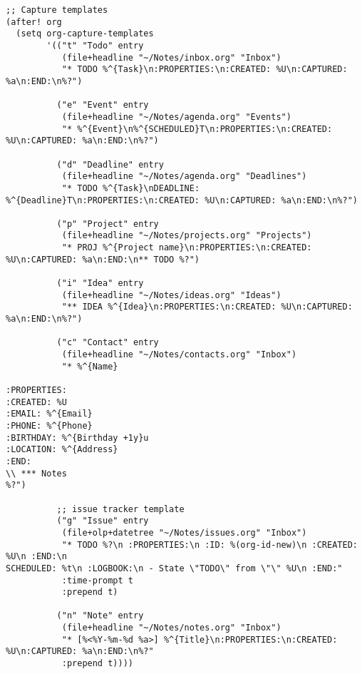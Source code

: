 \documentclass[11pt]{article}
\begin{document}
\begin{verbatim}
;; Capture templates
(after! org
  (setq org-capture-templates
        '(("t" "Todo" entry
           (file+headline "~/Notes/inbox.org" "Inbox")
           "* TODO %^{Task}\n:PROPERTIES:\n:CREATED: %U\n:CAPTURED: %a\n:END:\n%?")

          ("e" "Event" entry
           (file+headline "~/Notes/agenda.org" "Events")
           "* %^{Event}\n%^{SCHEDULED}T\n:PROPERTIES:\n:CREATED: %U\n:CAPTURED: %a\n:END:\n%?")

          ("d" "Deadline" entry
           (file+headline "~/Notes/agenda.org" "Deadlines")
           "* TODO %^{Task}\nDEADLINE: %^{Deadline}T\n:PROPERTIES:\n:CREATED: %U\n:CAPTURED: %a\n:END:\n%?")

          ("p" "Project" entry
           (file+headline "~/Notes/projects.org" "Projects")
           "* PROJ %^{Project name}\n:PROPERTIES:\n:CREATED: %U\n:CAPTURED: %a\n:END:\n** TODO %?")

          ("i" "Idea" entry
           (file+headline "~/Notes/ideas.org" "Ideas")
           "** IDEA %^{Idea}\n:PROPERTIES:\n:CREATED: %U\n:CAPTURED: %a\n:END:\n%?")

          ("c" "Contact" entry
           (file+headline "~/Notes/contacts.org" "Inbox")
           "* %^{Name}

:PROPERTIES:
:CREATED: %U
:EMAIL: %^{Email}
:PHONE: %^{Phone}
:BIRTHDAY: %^{Birthday +1y}u
:LOCATION: %^{Address}
:END:
\\ *** Notes
%?")

          ;; issue tracker template
          ("g" "Issue" entry
           (file+olp+datetree "~/Notes/issues.org" "Inbox")
           "* TODO %?\n :PROPERTIES:\n :ID: %(org-id-new)\n :CREATED: %U\n :END:\n
SCHEDULED: %t\n :LOGBOOK:\n - State \"TODO\" from \"\" %U\n :END:"
           :time-prompt t
           :prepend t)

          ("n" "Note" entry
           (file+headline "~/Notes/notes.org" "Inbox")
           "* [%<%Y-%m-%d %a>] %^{Title}\n:PROPERTIES:\n:CREATED: %U\n:CAPTURED: %a\n:END:\n%?"
           :prepend t))))
\end{verbatim}
\end{document}
